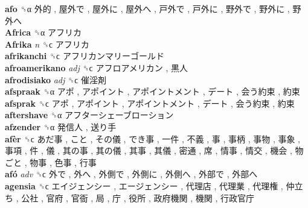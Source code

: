 \textbf{afo} ␝α   外的 ,  屋外で ,  屋外に ,  屋外へ ,  戸外で ,  戸外に ,  野外で ,  野外に ,  野外へ   \\
\textbf{Africa} ␝α   アフリカ   \\
\textbf{Afrika} \emph{n}  ␝ϲ   アフリカ   \\
\textbf{afrikanchi} ␝ϲ   アフリカンマリーゴールド   \\
\textbf{afroamerikano} \emph{adj}  ␝ϲ   アフロアメリカン ,  黒人   \\
\textbf{afrodisiako} \emph{adj}  ␝ϲ   催淫剤   \\
\textbf{afspraak} ␝α   アポ ,  アポイント ,  アポイントメント ,  デート ,  会う約束 ,  約束   \\
\textbf{afsprak} ␝ϲ   アポ ,  アポイント ,  アポイントメント ,  デート ,  会う約束 ,  約束   \\
\textbf{aftershave} ␝α   アフターシェーブローション   \\
\textbf{afzender} ␝α   発信人 ,  送り手   \\
\textbf{afèr} ␝ϲ   あだ事 ,  こと ,  その儀 ,  でき事 ,  一件 ,  不義 ,  事 ,  事柄 ,  事物 ,  事象 ,  事項 ,  件 ,  儀 ,  其の事 ,  其の儀 ,  其事 ,  其儀 ,  密通 ,  席 ,  情事 ,  情交 ,  機会 ,  物ごと ,  物事 ,  色事 ,  行事   \\
\textbf{afó} \emph{adv}  ␝ϲ   外で ,  外へ ,  外側で ,  外側に ,  外側へ ,  外部で ,  外部へ   \\
\textbf{agensia} ␝ϲ   エイジェンシー ,  エージェンシー ,  代理店 ,  代理業 ,  代理権 ,  仲立ち ,  公社 ,  官府 ,  官衙 ,  局 ,  庁 ,  役所 ,  政府機関 ,  機関 ,  行政官庁   \\
